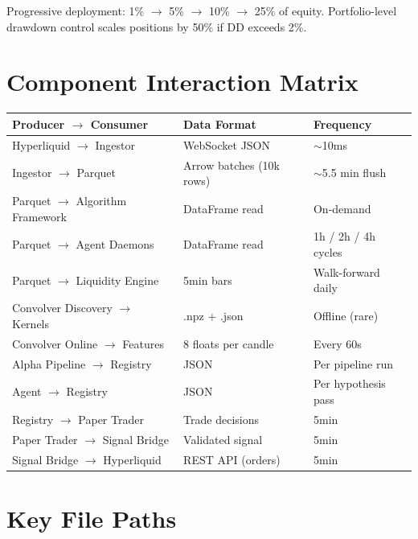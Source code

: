 \documentclass[11pt,a4paper]{article}
\begin{document}
Progressive deployment: 1\% $\to$ 5\% $\to$ 10\% $\to$ 25\% of equity. Portfolio-level drawdown control scales positions by 50\% if DD exceeds 2\%.

\section{Component Interaction Matrix}

\begin{longtable}{|l|l|l|}
\hline
\textbf{Producer $\to$ Consumer} & \textbf{Data Format} & \textbf{Frequency} \\
\hline
Hyperliquid $\to$ Ingestor & WebSocket JSON & $\sim$10ms \\
Ingestor $\to$ Parquet & Arrow batches (10k rows) & $\sim$5.5 min flush \\
Parquet $\to$ Algorithm Framework & DataFrame read & On-demand \\
Parquet $\to$ Agent Daemons & DataFrame read & 1h / 2h / 4h cycles \\
Parquet $\to$ Liquidity Engine & 5min bars & Walk-forward daily \\
Convolver Discovery $\to$ Kernels & .npz + .json & Offline (rare) \\
Convolver Online $\to$ Features & 8 floats per candle & Every 60s \\
Alpha Pipeline $\to$ Registry & JSON & Per pipeline run \\
Agent $\to$ Registry & JSON & Per hypothesis pass \\
Registry $\to$ Paper Trader & Trade decisions & 5min \\
Paper Trader $\to$ Signal Bridge & Validated signal & 5min \\
Signal Bridge $\to$ Hyperliquid & REST API (orders) & 5min \\
\hline
\end{longtable}

\section{Key File Paths}
\end{document}
